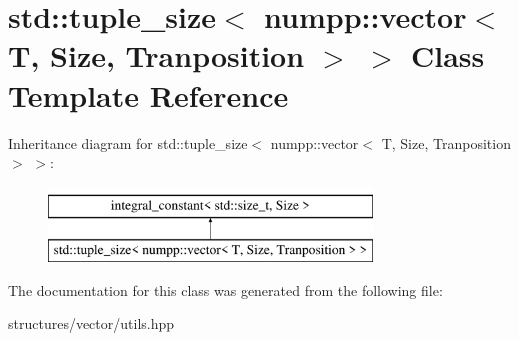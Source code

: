 \hypertarget{classstd_1_1tuple__size_3_01numpp_1_1vector_3_01T_00_01Size_00_01Tranposition_01_4_01_4}{}\section{std\+:\+:tuple\+\_\+size$<$ numpp\+:\+:vector$<$ T, Size, Tranposition $>$ $>$ Class Template Reference}
\label{classstd_1_1tuple__size_3_01numpp_1_1vector_3_01T_00_01Size_00_01Tranposition_01_4_01_4}
Inheritance diagram for std\+:\+:tuple\+\_\+size$<$ numpp\+:\+:vector$<$ T, Size, Tranposition $>$ $>$\+:\begin{figure}[H]
\begin{center}
\leavevmode
\includegraphics[height=2.000000cm]{classstd_1_1tuple__size_3_01numpp_1_1vector_3_01T_00_01Size_00_01Tranposition_01_4_01_4}
\end{center}
\end{figure}


The documentation for this class was generated from the following file\+:\begin{DoxyCompactItemize}
\item 
structures/vector/utils.\+hpp\end{DoxyCompactItemize}
